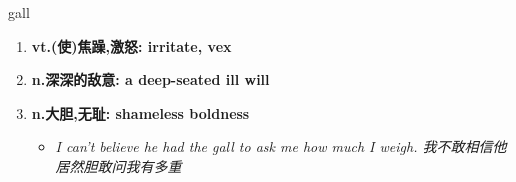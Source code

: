 
\begin{frame}
{\huge gall}
\begin{center}
\begin{enumerate}\Large
  \item \textbf{vt.(使)焦躁,激怒: irritate, vex}
  \item \textbf{n.深深的敌意: a deep-seated ill will}
  \item \textbf{n.大胆,无耻: shameless boldness}
  \begin{itemize}
    \item \em{\Large{I can't believe he had the gall to ask me how much I weigh. 我不敢相信他居然胆敢问我有多重}}
  \end{itemize}
\end{enumerate}
\end{center}
\end{frame}
